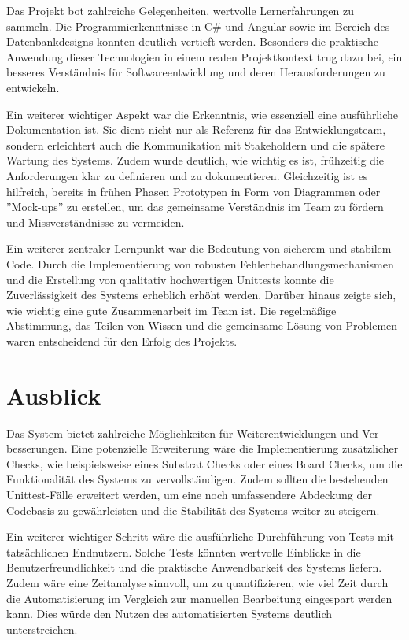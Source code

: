 Das Projekt bot zahlreiche Gelegenheiten, wertvolle Lernerfahrungen zu sammeln. Die Programmierkenntnisse in C\# und Angular sowie im Bereich des Datenbankdesigns konnten deutlich vertieft werden. Besonders die praktische Anwendung dieser Technologien in einem realen Projektkontext trug dazu bei, ein besseres Verständnis für Softwareentwicklung und deren Herausforderungen zu entwickeln.

Ein weiterer wichtiger Aspekt war die Erkenntnis, wie essenziell eine ausführliche Dokumentation ist. Sie dient nicht nur als Referenz für das Entwicklungsteam, sondern erleichtert auch die Kommunikation mit Stakeholdern und die spätere Wartung des Systems. Zudem wurde deutlich, wie wichtig es ist, frühzeitig die Anforderungen klar zu definieren und zu dokumentieren. Gleichzeitig ist es hilfreich, bereits in frühen Phasen Prototypen in Form von Diagrammen oder ''Mock-ups'' zu erstellen, um das gemeinsame Verständnis im Team zu fördern und Missverständnisse zu vermeiden.

Ein weiterer zentraler Lernpunkt war die Bedeutung von sicherem und stabilem Code. Durch die Implementierung von robusten Fehlerbehandlungsmechanismen und die Erstellung von qualitativ hochwertigen Unittests konnte die Zuverlässigkeit des Systems erheblich erhöht werden.  Darüber hinaus zeigte sich, wie wichtig eine gute Zusammenarbeit im Team ist. Die regelmäßige Abstimmung, das Teilen von Wissen und die gemeinsame Lösung von Problemen waren entscheidend für den Erfolg des Projekts.

\section{Ausblick}

Das System bietet zahlreiche Möglichkeiten für Weiterentwicklungen und Ver-\linebreak besserungen. Eine potenzielle Erweiterung wäre die Implementierung zusätzlicher Checks, wie beispielsweise eines Substrat Checks oder eines Board Checks, um die Funktionalität des Systems zu vervollständigen. Zudem sollten die bestehenden Unittest-Fälle erweitert werden, um eine noch umfassendere Abdeckung der Codebasis zu gewährleisten und die Stabilität des Systems weiter zu steigern.

Ein weiterer wichtiger Schritt wäre die ausführliche Durchführung von Tests mit tatsächlichen Endnutzern. Solche Tests könnten wertvolle Einblicke in die Benutzerfreundlichkeit und die praktische Anwendbarkeit des Systems liefern. Zudem wäre eine Zeitanalyse sinnvoll, um zu quantifizieren, wie viel Zeit durch die Automatisierung im Vergleich zur manuellen Bearbeitung eingespart werden kann. Dies würde den Nutzen des automatisierten Systems deutlich unterstreichen.

